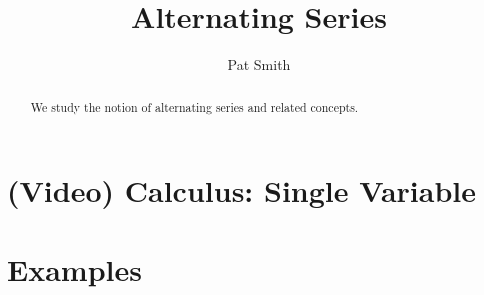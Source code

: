 \documentclass{ximera}
\title{Alternating Series}
\author{Pat Smith}
\begin{document}
\begin{abstract}
We study the notion of alternating series and related concepts.
\end{abstract}
\maketitle

\section*{(Video) Calculus: Single Variable} 

\section*{Examples}

\begin{example}

\end{example}

\begin{example}

\end{example}
\end{document}
